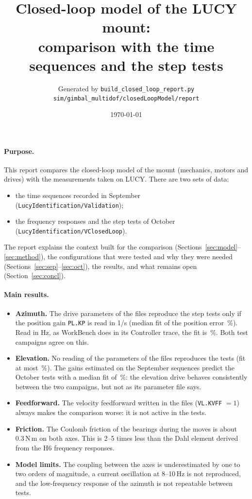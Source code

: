 \documentclass[10pt,a4paper]{article}
\title{Closed-loop model of the LUCY mount:\\ comparison with the time sequences and the step tests}
\author{Generated by \texttt{build\_closed\_loop\_report.py}\\ \small\texttt{sim/gimbal\_multidof/closedLoopModel/report}}
\date{\today}
\numberwithin{equation}{section}
\begin{document}
\maketitle

\paragraph{Purpose.} This report compares the closed-loop model of the mount (mechanics, motors and drives) with the measurements taken on LUCY. There are two sets of data:
\begin{itemize}
\item the time sequences recorded in September (\texttt{LucyIdentification/Validation});
\item the frequency responses and the step tests of October (\texttt{LucyIdentification/VClosedLoop}).
\end{itemize}
The report explains the context built for the comparison (Sections~\ref{sec:model}--\ref{sec:method}), the configurations that were tested and why they were needed (Sections~\ref{sec:sep}--\ref{sec:oct}), the results, and what remains open (Section~\ref{sec:concl}).

\paragraph{Main results.}
\begin{itemize}
\item \textbf{Azimuth.} The drive parameters of the files reproduce the step tests only if the position gain \texttt{PL.KP} is read in 1/s (median fit of the position error \OctFitAzB\,\%). Read in Hz, as WorkBench does in its Controller trace, the fit is \OctFitAzA\,\%. Both test campaigns agree on this.
\item \textbf{Elevation.} No reading of the parameters of the files reproduces the tests (fit at most \OctFitElE\,\%). The gains estimated on the September sequences predict the October tests with a median fit of \OctFitElH\,\%: the elevation drive behaves consistently between the two campaigns, but not as its parameter file says.
\item \textbf{Feedforward.} The velocity feedforward written in the files (\texttt{VL.KVFF} $=1$) always makes the comparison worse: it is not active in the tests.
\item \textbf{Friction.} The Coulomb friction of the bearings during the moves is about 0.3\,N\,m on both axes. This is 2--5 times less than the Dahl element derived from the H6 frequency responses.
\item \textbf{Model limits.} The coupling between the axes is underestimated by one to two orders of magnitude, a current oscillation at 8--10\,Hz is not reproduced, and the low-frequency response of the azimuth is not repeatable between tests.
\end{itemize}
\end{document}
